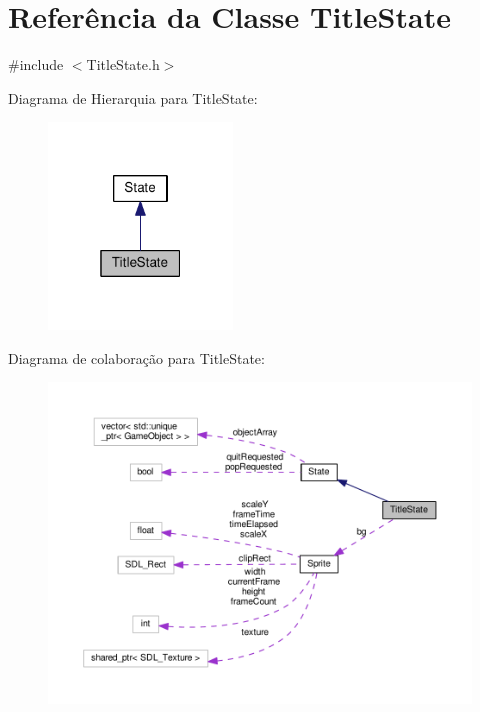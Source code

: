 \hypertarget{classTitleState}{\section{Referência da Classe Title\+State}
\label{classTitleState}
}


{\ttfamily \#include $<$Title\+State.\+h$>$}



Diagrama de Hierarquia para Title\+State\+:\nopagebreak
\begin{figure}[H]
\begin{center}
\leavevmode
\includegraphics[width=139pt]{classTitleState__inherit__graph}
\end{center}
\end{figure}


Diagrama de colaboração para Title\+State\+:\nopagebreak
\begin{figure}[H]
\begin{center}
\leavevmode
\includegraphics[width=350pt]{classTitleState__coll__graph}
\end{center}
\end{figure}
